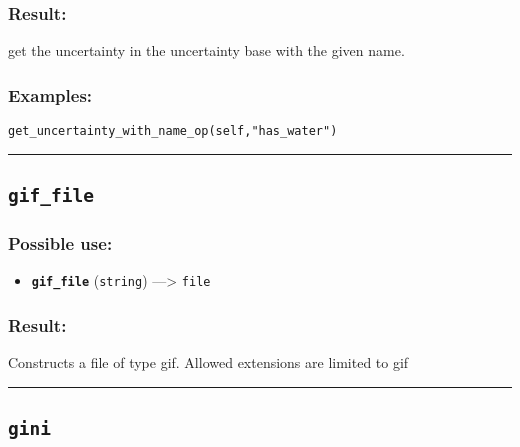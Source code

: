 \documentclass[]{book}
\providecommand{\tightlist}{%
  \setlength{\itemsep}{0pt}\setlength{\parskip}{0pt}}
\theoremstyle{definition}
\theoremstyle{definition}
\theoremstyle{definition}
\theoremstyle{remark}
\begin{document}
\subsubsection{Result:}\label{result-227}

get the uncertainty in the uncertainty base with the given name.

\subsubsection{Examples:}\label{examples-180}

\begin{verbatim}
get_uncertainty_with_name_op(self,"has_water") 
\end{verbatim}

\begin{center}\rule{0.5\linewidth}{\linethickness}\end{center}

\subsection{\texorpdfstring{\texttt{gif\_file}}{gif\_file}}\label{gif_file}

\subsubsection{Possible use:}\label{possible-use-236}

\begin{itemize}
\tightlist
\item
  \textbf{\texttt{gif\_file}} (\texttt{string}) ---\textgreater{}
  \texttt{file}
\end{itemize}

\subsubsection{Result:}\label{result-228}

Constructs a file of type gif. Allowed extensions are limited to gif

\begin{center}\rule{0.5\linewidth}{\linethickness}\end{center}

\subsection{\texorpdfstring{\texttt{gini}}{gini}}\label{gini}
\end{document}
